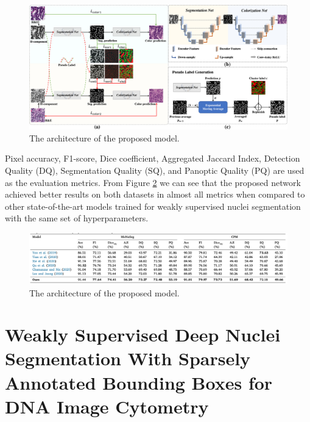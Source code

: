 \begin{figure}[H]
    \begin{centering}
    \includegraphics[width=14cm]{assets/images/rw-selfsup-arch.jpg}
    \par\end{centering}
    \caption{The architecture of the proposed model.}
    \label{fig:rw-self-sup-arch}
\end{figure}

Pixel accuracy, F1-score, Dice coefficient, Aggregated Jaccard Index, Detection Quality (DQ), Segmentation Quality (SQ), and Panoptic Quality (PQ) are used as the evaluation metrics. From Figure \ref{fig:rw-self-sup-results} we can see that the proposed network achieved better results on both datasets in almost all metrics when compared to other state-of-the-art models trained for weakly supervised nuclei segmentation with the same set of hyperparameters.

\begin{figure}[H]
    \begin{centering}
    \includegraphics[width=14cm]{assets/images/rw-selfsup-results.png}
    \par\end{centering}
    \caption{The architecture of the proposed model.}
    \label{fig:rw-self-sup-results}
\end{figure}

\section{Weakly Supervised Deep Nuclei Segmentation With Sparsely Annotated Bounding Boxes for DNA Image Cytometry \cite{Liang2023}}
\label{section:related-5}

